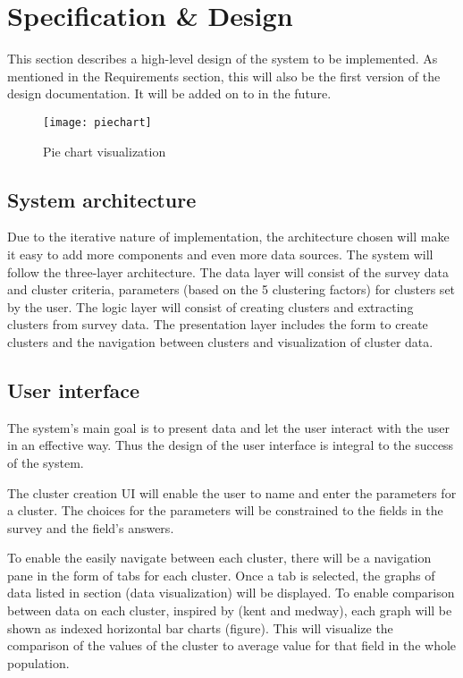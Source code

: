 \chapter{Specification \& Design}

This section describes a high-level design of the system to be implemented. As mentioned in the Requirements section, this will also be the first version of the design documentation. It will be added on to in the future.

\begin{figure}[h]
\centering
\texttt{[image: piechart]}
\caption{Pie chart visualization}
\end{figure}

\section{System architecture}
Due to the iterative nature of implementation, the architecture chosen will make it easy to add more components and even more data sources. The system will follow the three-layer architecture. The data layer will consist of the survey data and cluster criteria, parameters (based on the 5 clustering factors) for clusters set by the user. The logic layer will consist of creating clusters and extracting clusters from survey data. The presentation layer includes the form to create clusters and the navigation between clusters and visualization of cluster data.

\section{User interface}
The system’s main goal is to present data and let the user interact with the user in an effective way. Thus the design of the user interface is integral to the success of the system.

The cluster creation UI will enable the user to name and enter the parameters for a cluster. The choices for the parameters will be constrained to the fields in the survey and the field’s answers.

To enable the easily navigate between each cluster, there will be a navigation pane in the form of tabs for each cluster. Once a tab is selected, the graphs of data listed in section (data visualization) will be displayed. To enable comparison between data on each cluster, inspired by (kent and medway), each graph will be shown as indexed horizontal bar charts (figure). This will visualize the comparison of the values of the cluster to average value for that field in the whole population.
